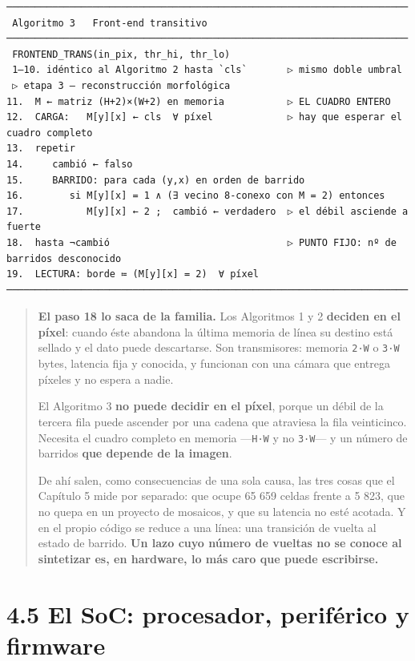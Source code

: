 \begin{verbatim}
──────────────────────────────────────────────────────────────────────
 Algoritmo 3   Front-end transitivo
──────────────────────────────────────────────────────────────────────
 FRONTEND_TRANS(in_pix, thr_hi, thr_lo)
 1–10. idéntico al Algoritmo 2 hasta `cls`       ▷ mismo doble umbral
 ▷ etapa 3 — reconstrucción morfológica
11.  M ← matriz (H+2)×(W+2) en memoria           ▷ EL CUADRO ENTERO
12.  CARGA:   M[y][x] ← cls  ∀ píxel             ▷ hay que esperar el cuadro completo
13.  repetir
14.     cambió ← falso
15.     BARRIDO: para cada (y,x) en orden de barrido
16.        si M[y][x] = 1 ∧ (∃ vecino 8-conexo con M = 2) entonces
17.           M[y][x] ← 2 ;  cambió ← verdadero  ▷ el débil asciende a fuerte
18.  hasta ¬cambió                               ▷ PUNTO FIJO: nº de barridos desconocido
19.  LECTURA: borde ≔ (M[y][x] = 2)  ∀ píxel
──────────────────────────────────────────────────────────────────────
\end{verbatim}

\begin{quote}
\textbf{El paso 18 lo saca de la familia.} Los Algoritmos 1 y 2
\textbf{deciden en el píxel}: cuando éste abandona la última memoria de
línea su destino está sellado y el dato puede descartarse. Son
transmisores: memoria \texttt{2·W} o \texttt{3·W} bytes, latencia fija y
conocida, y funcionan con una cámara que entrega píxeles y no espera a
nadie.

El Algoritmo 3 \textbf{no puede decidir en el píxel}, porque un débil de
la tercera fila puede ascender por una cadena que atraviesa la fila
veinticinco. Necesita el cuadro completo en memoria ---\texttt{H·W} y no
\texttt{3·W}--- y un número de barridos \textbf{que depende de la
imagen}.

De ahí salen, como consecuencias de una sola causa, las tres cosas que
el Capítulo 5 mide por separado: que ocupe 65 659 celdas frente a 5 823,
que no quepa en un proyecto de mosaicos, y que su latencia no esté
acotada. Y en el propio código se reduce a una línea: una transición de
vuelta al estado de barrido. \textbf{Un lazo cuyo número de vueltas no
se conoce al sintetizar es, en hardware, lo más caro que puede
escribirse.}
\end{quote}

\section{4.5 El SoC: procesador, periférico y
firmware}\label{el-soc-procesador-perifuxe9rico-y-firmware}

